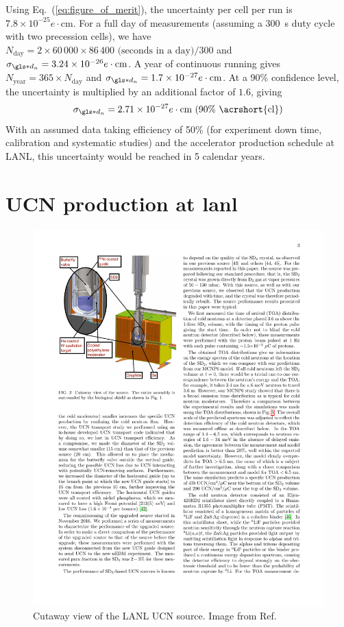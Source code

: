 Using Eq.~(\ref{eq:figure_of_merit}), the uncertainty per cell per run is $7.8 \times 10^{-25}e\cdot\text{cm}$. For a full day of measurements (assuming a \qty{300}{\s} duty cycle with two precession cells), we have $N_\text{day}=2\times60\,000\times86\,400\text{ (seconds in a day)}/300$ and $\sigma_{\gls*{d_n}}=3.24\times10^{-26}e\cdot\text{cm}$. A year of continuous running gives $N_\text{year}=365\times N_\text{day}$ and $\sigma_{\gls*{d_n}}=1.7\times10^{-27}e\cdot\text{cm}$. At a 90\% confidence level, the uncertainty is multiplied by an additional factor of $1.6$, giving
%
\begin{gather}
    \sigma_{\gls*{d_n}}=2.71\times10^{-27}e\cdot\text{cm (90\% \acrshort{cl})}
\end{gather}
%
With an assumed data taking efficiency of 50\% (for experiment down time, calibration and systematic studies) and the accelerator production schedule at LANL, this uncertainty would be reached in 5 calendar years.


\section
{
    \texorpdfstring{UCN production at \acrshort{lanl}}
                   {UCN production at LANL}
}\label{sec:lanl_ucn_source}


\begin{figure}
    \centering
    \includegraphics[width=0.6 \textwidth]{figures/lanl_ucn_source.pdf}
    \caption[Cutaway view of the LANL UCN source]
    {Cutaway view of the LANL UCN source. Image from Ref.~\cite{ito_performance_2018}}
    \label{fig:lanl_ucn_source}
\end{figure}

